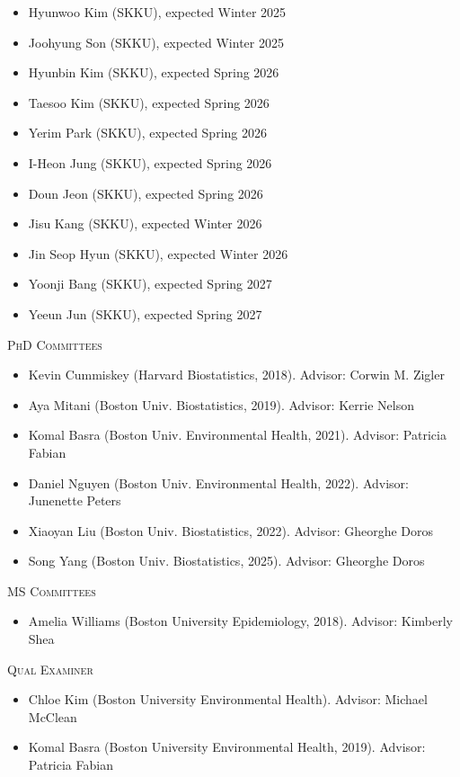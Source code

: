 \documentclass[10pt]{article}
\newenvironment{innerlist}[1][\enskip\textbullet]%
        {\begin{itemize}[#1,leftmargin=*,parsep=0pt,itemsep=0pt,topsep=0pt,partopsep=0pt]}
        {\end{itemize}}
\begin{document}
\begin{innerlist}
\item[] Hyunwoo Kim (SKKU), expected Winter 2025
\item[] Joohyung Son (SKKU), expected Winter 2025
\item[] Hyunbin Kim (SKKU), expected Spring 2026
\item[] Taesoo Kim (SKKU), expected Spring 2026
\item[] Yerim Park (SKKU), expected Spring 2026
\item[] I-Heon Jung (SKKU), expected Spring 2026
\item[] Doun Jeon (SKKU), expected Spring 2026
\item[] Jisu Kang (SKKU), expected Winter 2026
\item[] Jin Seop Hyun (SKKU), expected Winter 2026
\item[] Yoonji Bang (SKKU), expected Spring 2027
\item[] Yeeun Jun (SKKU), expected Spring 2027
\end{innerlist}
\medskip

\textsc{PhD Committees}
\smallskip
\begin{innerlist}
\item[] Kevin Cummiskey (Harvard Biostatistics, 2018). Advisor: Corwin M. Zigler
\item[] Aya Mitani (Boston Univ. Biostatistics, 2019). Advisor: Kerrie Nelson
\item[] Komal Basra (Boston Univ. Environmental Health, 2021). Advisor: Patricia Fabian
\item[] Daniel Nguyen (Boston Univ. Environmental Health, 2022). Advisor: Junenette Peters
\item[] Xiaoyan Liu (Boston Univ. Biostatistics, 2022). Advisor: Gheorghe Doros
\item[] Song Yang (Boston Univ. Biostatistics, 2025). Advisor: Gheorghe Doros
\end{innerlist}
\medskip

\textsc{MS Committees}
\smallskip
\begin{innerlist}
\item[] Amelia Williams (Boston University Epidemiology, 2018). Advisor: Kimberly Shea
\end{innerlist}
\medskip


\textsc{Qual Examiner}
\smallskip
\begin{innerlist}
\item[] Chloe Kim (Boston University Environmental Health). Advisor: Michael McClean
\item[] Komal Basra (Boston University Environmental Health, 2019). Advisor: Patricia Fabian
\end{innerlist}
\medskip
\end{document}
